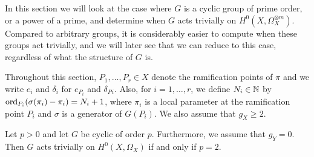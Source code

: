 In this section we will look at the case where $G$ is a cyclic group of prime order, or a power of a prime, and determine when $G$ acts trivially on $H^0(X,\Omega_X^{\otimes m})$.
Compared to arbitrary groups, it is considerably easier to compute when these groups act trivially, and we will later see that we can reduce to this case, regardless of what the structure of $G$ is.


Throughout this section, $P_1,\ldots ,P_r \in X$ denote the ramification points of $\pi$ and we write $e_i$ and $\delta_i$ for $e_{P_i}$ and $\delta_P{_i}$.
Also, for $i=1, \ldots, r$, we define $N_i \in {\mathbb N}$ by $\operatorname{ord}_{P_i}(\sigma(\pi_i) - \pi_i) = N_i +1$, where $\pi_i$ is a local parameter at the ramification point $P_i$ and $\sigma$ is a generator of $G(P_i)$. 
We also assume that $g_X \geq 2$.


\begin{prop}\label{m=1}
Let $p  > 0$ and let $G$ be cyclic of order $p$.
Furthermore, we assume that $g_Y=0$.
Then $G$ acts trivially on $H^0(X,\Omega_X)$ if and only if $p=2$. 
\end{prop}
